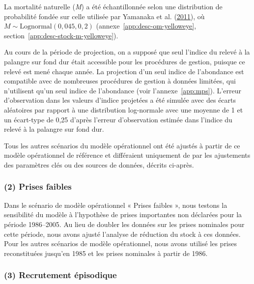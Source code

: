 \documentclass[11pt]{book}
\begin{document}
La mortalité naturelle (\emph{M}) a été échantillonnée selon une distribution de probabilité fondée sur celle utilisée par Yamanaka et al. (\protect\hyperlink{ref-yamanaka2011}{2011}), où \(M \sim \textrm{Lognormal}(0,045, 0,2)\) (annexe~\ref{app:desc-om-yelloweye}, section~\ref{app:desc-stock-m-yelloweye}).

Au cours de la période de projection, on a supposé que seul l'indice du relevé à la palangre sur fond dur était accessible pour les procédures de gestion, puisque ce relevé est mené chaque année. La projection d'un seul indice de l'abondance est compatible avec de nombreuses procédures de gestion à données limitées, qui n'utilisent qu'un seul indice de l'abondance (voir l'annexe~\ref{app:mps}). L'erreur d'observation dans les valeurs d'indice projetées a été simulée avec des écarts aléatoires par rapport à une distribution log-normale avec une moyenne de 1 et un écart-type de 0,25 d'après l'erreur d'observation estimée dans l'indice du relevé à la palangre sur fond dur.

Tous les autres scénarios du modèle opérationnel ont été ajustés à partir de ce modèle opérationnel de référence et différaient uniquement de par les ajustements des paramètres clés ou des sources de données, décrits ci-après.

\hypertarget{sec:approach3-reference2}{%
\subsubsection{(2) Prises faibles}\label{sec:approach3-reference2}}

Dans le scénario de modèle opérationnel « Prises faibles », nous testons la sensibilité du modèle à l'hypothèse de prises importantes non déclarées pour la période 1986--2005. Au lieu de doubler les données sur les prises nominales pour cette période, nous avons ajusté l'analyse de réduction du stock à ces données. Pour les autres scénarios de modèle opérationnel, nous avons utilisé les prises reconstituées jusqu'en 1985 et les prises nominales à partir de 1986.

\hypertarget{sec:approach3-reference3}{%
\subsubsection{(3) Recrutement épisodique}\label{sec:approach3-reference3}}
\end{document}
